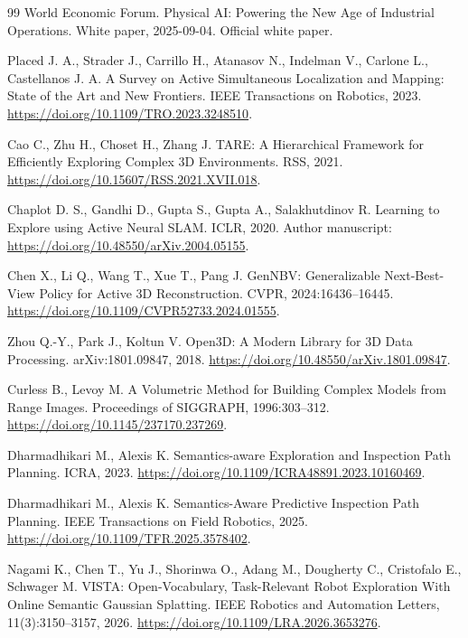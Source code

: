 \documentclass[11pt,a4paper]{article}
\providecommand{\href}[2]{#2}
\begin{document}
\clearpage


\clearpage




\clearpage
\begin{thebibliography}{99}
 World Economic Forum. Physical AI: Powering the New Age of Industrial Operations. White paper, 2025-09-04. \href{https://www.weforum.org/publications/physical-ai-powering-the-new-age-of-industrial-operations/}{Official white paper}.

 Placed J. A., Strader J., Carrillo H., Atanasov N., Indelman V., Carlone L., Castellanos J. A. A Survey on Active Simultaneous Localization and Mapping: State of the Art and New Frontiers. IEEE Transactions on Robotics, 2023. \url{https://doi.org/10.1109/TRO.2023.3248510}.

 Cao C., Zhu H., Choset H., Zhang J. TARE: A Hierarchical Framework for Efficiently Exploring Complex 3D Environments. RSS, 2021. \url{https://doi.org/10.15607/RSS.2021.XVII.018}.

 Chaplot D. S., Gandhi D., Gupta S., Gupta A., Salakhutdinov R. Learning to Explore using Active Neural SLAM. ICLR, 2020. Author manuscript: \url{https://doi.org/10.48550/arXiv.2004.05155}.

 Chen X., Li Q., Wang T., Xue T., Pang J. GenNBV: Generalizable Next-Best-View Policy for Active 3D Reconstruction. CVPR, 2024:16436--16445. \url{https://doi.org/10.1109/CVPR52733.2024.01555}.

 Zhou Q.-Y., Park J., Koltun V. Open3D: A Modern Library for 3D Data Processing. arXiv:1801.09847, 2018. \url{https://doi.org/10.48550/arXiv.1801.09847}.

 Curless B., Levoy M. A Volumetric Method for Building Complex Models from Range Images. Proceedings of SIGGRAPH, 1996:303--312. \url{https://doi.org/10.1145/237170.237269}.

 Dharmadhikari M., Alexis K. Semantics-aware Exploration and Inspection Path Planning. ICRA, 2023. \url{https://doi.org/10.1109/ICRA48891.2023.10160469}.

 Dharmadhikari M., Alexis K. Semantics-Aware Predictive Inspection Path Planning. IEEE Transactions on Field Robotics, 2025. \url{https://doi.org/10.1109/TFR.2025.3578402}.

 Nagami K., Chen T., Yu J., Shorinwa O., Adang M., Dougherty C., Cristofalo E., Schwager M. VISTA: Open-Vocabulary, Task-Relevant Robot Exploration With Online Semantic Gaussian Splatting. IEEE Robotics and Automation Letters, 11(3):3150--3157, 2026. \url{https://doi.org/10.1109/LRA.2026.3653276}.


\end{thebibliography}
\end{document}
